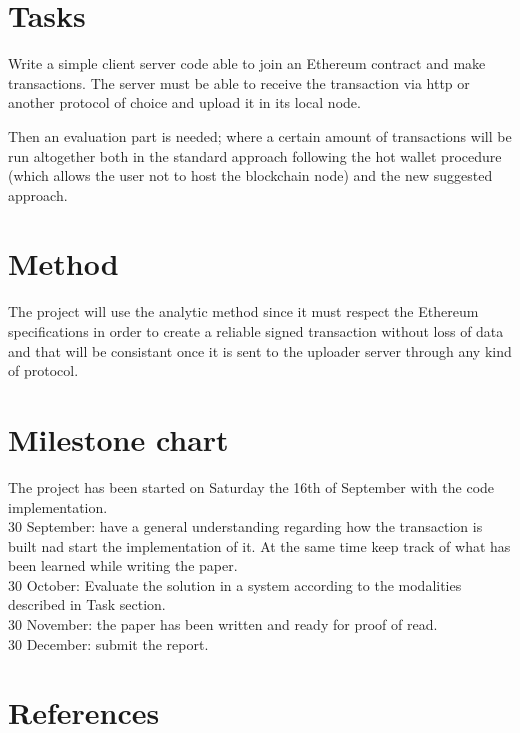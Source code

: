 \documentclass[paper=a4, fontsize=11pt]{scrartcl} %
\numberwithin{equation}{section} %
\numberwithin{figure}{section} %
\numberwithin{table}{section} %
\begin{document}
\section{Tasks}

Write a simple client server code able to join an Ethereum contract and make transactions.
The server must be able to receive the transaction via http or another protocol of choice and upload it in its local node.

Then an evaluation part is needed; where a certain amount of transactions will be run altogether both in the standard approach following the hot wallet procedure (which allows the user not to host the blockchain node) and the new suggested approach.

\section{Method}

The project will use the analytic method since it must respect the Ethereum specifications in order to create a reliable signed transaction without loss of data and that will be consistant once it is sent to the uploader server through any kind of protocol.

\section{Milestone chart}

The project has been started on Saturday the 16th of September with the code implementation. \\

30 September: have a general understanding regarding how the transaction is built nad start the implementation of it. At the same time keep track of what has been learned while writing the paper. \\

30 October: Evaluate the solution in a system according to the modalities described in Task section. \\

30 November: the paper has been written and ready for proof of read. \\

30 December: submit the report. \\

\section{References}
\end{document}

